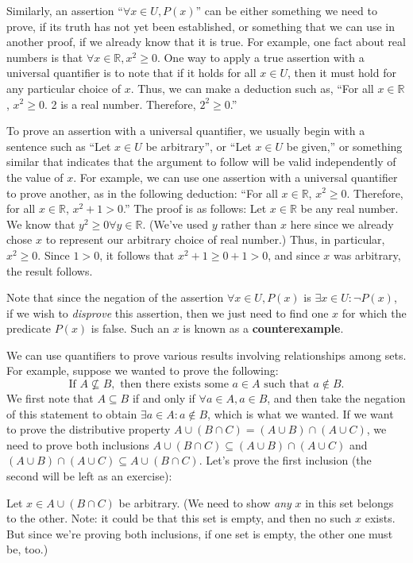 \documentclass[letterpaper,12pt]{article}
\newcommand{\R}{\mathbb{R}}
\begin{document}
Similarly, an assertion ``$\forall x\in U, P(x)$'' can be either something we need to prove, if its truth has not yet been established, or something that we can use in another proof, if we already know that it is true. For example, one fact about real numbers is that $\forall x\in\R, x^2\geq 0$. One way to apply a true assertion with a universal quantifier is to note that if it holds for all $x\in U$, then it must hold for any particular choice of $x$. Thus, we can make a deduction such as, ``For all $x\in\R$, $x^2\geq 0$. 2 is a real number. Therefore, $2^2\geq 0$.''

To prove an assertion with a universal quantifier, we usually begin with a sentence such as ``Let $x\in U$ be arbitrary'', or ``Let $x\in U$ be given,'' or something similar that indicates that the argument to follow will be valid independently of the value of $x$. For example, we can use one assertion with a universal quantifier to prove another, as in the following deduction: ``For all $x\in\R$, $x^2\geq 0$. Therefore, for all $x\in \R$, $x^2+1>0$.'' The proof is as follows: Let $x\in \R$ be any real number. We know that $y^2\geq 0 \forall y\in\R$. (We've used $y$ rather than $x$ here since we already chose $x$ to represent our arbitrary choice of real number.) Thus, in particular, $x^2\geq 0$. Since $1>0$, it follows that $x^2+1\geq 0+1>0$, and since $x$ was arbitrary, the result follows.

Note that since the negation of the assertion $\forall x\in U, P(x)$ is $\exists x\in U: \neg P(x)$, if we wish to {\em disprove} this assertion, then we just need to find one $x$ for which the predicate $P(x)$ is false. Such an $x$ is known as a {\bf counterexample}.

We can use quantifiers to prove various results involving relationships among sets. For example, suppose we wanted to prove the following:
\[
\text{If } A\nsubseteq B, \text{ then there exists some } a\in A \text{ such that } a\notin B.
\]
We first note that $A\subseteq B$ if and only if $\forall a\in A, a\in B$, and then take the negation of this statement to obtain $\exists a\in A: a\notin B$, which is what we wanted. If we want to prove the distributive property $A\cup (B\cap C) = (A\cup B)\cap (A\cup C)$, we need to prove both inclusions $A\cup (B\cap C) \subseteq (A\cup B)\cap (A\cup C)$ and $(A\cup B)\cap (A\cup C)\subseteq A\cup (B\cap C)$. Let's prove the first inclusion (the second will be left as an exercise):

Let $x\in A\cup (B\cap C)$ be arbitrary. (We need to show {\em any} $x$ in this set belongs to the other. Note: it could be that this set is empty, and then no such $x$ exists. But since we're proving both inclusions, if one set is empty, the other one must be, too.)
\end{document}
